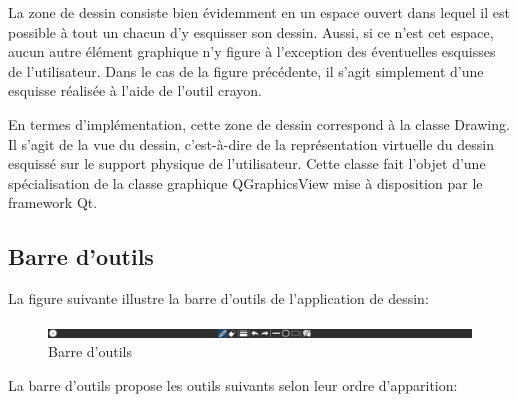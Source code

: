 \documentclass[11pt,a4paper,oldfontcommands]{memoir}
\begin{document}
La zone de dessin consiste bien évidemment en un espace ouvert dans lequel il est possible à tout un chacun d'y esquisser son dessin. Aussi, si ce n'est cet espace, aucun autre élément graphique n'y figure à l'exception des éventuelles esquisses de l'utilisateur. Dans le cas de la figure précédente, il s'agit simplement d'une esquisse réalisée à l'aide de l'outil crayon.

En termes d'implémentation, cette zone de dessin correspond à la classe Drawing. Il s'agit de la vue du dessin, c'est-à-dire de la représentation virtuelle du dessin esquissé sur le support physique de l'utilisateur. Cette classe fait l'objet d'une spécialisation de la classe graphique QGraphicsView mise à disposition par le framework Qt.

\newpage

\subsection{Barre d'outils}

La figure suivante illustre la barre d'outils de l'application de dessin:

\begin{figure}[h]
\centering
\includegraphics[scale=0.4]{images/toolbar.png}
\caption{Barre d'outils}
\end{figure}

La barre d'outils propose les outils suivants selon leur ordre d'apparition:
\end{document}
